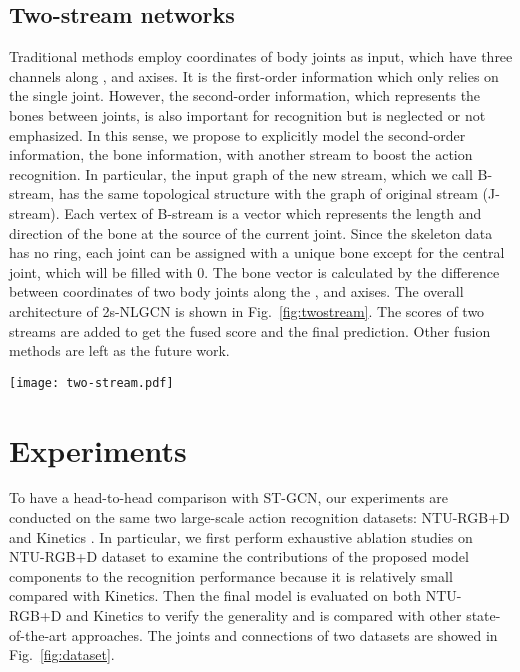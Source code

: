 \documentclass[10pt,twocolumn,letterpaper]{article}
\begin{document}
    \subsection{Two-stream networks}
    \label{tsn}
    Traditional methods employ coordinates of body joints as input, which have three channels along ,  and  axises. It is the first-order information which only relies on the single joint. However, the second-order information, which represents the bones between joints, is also important for recognition but is neglected or not emphasized. In this sense, we propose to explicitly model the second-order information, the bone information, with another stream to boost the action recognition. 
    In particular, the input graph of the new stream, which we call B-stream, has the same topological structure with the graph of original stream (J-stream). 
Each vertex of B-stream is a vector which represents the length and direction of the bone at the source of the current joint. 
    Since the skeleton data has no ring, each joint can be assigned with a unique bone except for the central joint, which will be filled with 0. The bone vector is calculated by the difference between coordinates of two body joints along the ,  and  axises.
    The overall architecture of 2s-NLGCN is shown in Fig.~\ref{fig:twostream}. The  scores of two streams are added to get the fused score and the final prediction. Other fusion methods are left as the future work.
    
    \begin{figure*}[!htb]
	\begin{center}
	\texttt{[image: two-stream.pdf]}
	\caption{The overall architecture of 2s-NLGCN. The scores of two stream are added to get the final prediction.}
	\label{fig:twostream}	
	\end{center}
	\end{figure*}

	\section{Experiments}
    To have a head-to-head comparison with ST-GCN, our experiments are conducted on the same two large-scale action recognition datasets: NTU-RGB+D \cite{shahroudy_ntu_2016} and Kinetics \cite{kay_kinetics_2017}. In particular, we first perform exhaustive ablation studies on NTU-RGB+D dataset to examine the contributions of the proposed model components to the recognition performance because it is relatively small compared with Kinetics. Then the final model is evaluated on both NTU-RGB+D and Kinetics to verify the generality and is compared with other state-of-the-art approaches. The joints and connections of two datasets are showed in Fig.~\ref{fig:dataset}.
    
\end{document}
